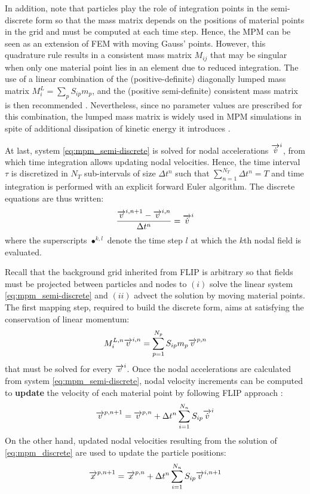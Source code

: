 In addition, note that particles play the role of integration points in the semi-discrete form so that the mass matrix depends on the positions of material points in the grid and must be computed at each time step. Hence, the MPM can be seen as an extension of FEM with moving Gauss' points. However, this quadrature rule results in a consistent mass matrix $M_{ij}$ that may be singular when only one material point lies in an element due to reduced integration. The use of a linear combination of the (positive-definite) diagonally lumped mass matrix $M^L_i=\sum_p S_{ip}m_p$, and the (positive semi-definite) consistent mass matrix is then recommended \cite{Love}. Nevertheless, since no parameter values are prescribed for this combination, the lumped mass matrix is widely used in MPM simulations in spite of additional dissipation of kinetic energy it introduces \cite{Mass_Flip}. 

At last, system \eqref{eq:mpm_semi-discrete} is solved for nodal accelerations ${\overrightarrow{\dot{v}}}^i$, from which time integration allows updating nodal velocities. Hence, the time interval $\tau$ is discretized in $N_T$ sub-intervals of size $\Delta t^n$ such that $\sum_{n=1}^{N_T} \Delta t^n = T$ and time integration is performed with an explicit forward Euler algorithm. The discrete equations are thus written:
\begin{equation}
  \label{eq:mpm_discrete}
  \frac{{\overrightarrow{v}}^{i,n+1}-{\overrightarrow{v}}^{i,n}}{\Delta t^n} = {\overrightarrow{\dot{v}}}^i
\end{equation}
where the superscripts $\bullet^{k,l}$ denote the time step $l$ at which the $k$th nodal field is evaluated. 

Recall that the background grid inherited from FLIP is arbitrary so that fields must be projected between particles and nodes to $(i)$ solve the linear system \eqref{eq:mpm_semi-discrete} and $(ii)$ advect the solution by moving material points. The first mapping step, required to build the discrete form, aims at satisfying the conservation of linear momentum:
\begin{equation}
  \label{eq:particles2nodes}
  M^{L,n}_i {\overrightarrow{v}}^{i,n} = \sum_{p=1}^{N_p} S_{ip}m_p {\overrightarrow{v}}^{p,n}
\end{equation}
that must be solved for every ${\overrightarrow{v}}^i$. Once the nodal accelerations are calculated from system \eqref{eq:mpm_semi-discrete}, nodal velocity increments can be computed to \textbf{update} the velocity of each material point by following FLIP approach \cite{PIC_Nishiguchi}:
\begin{equation}
  \label{eq:mp_velocity_update}
  {\overrightarrow{v}}^{p,n+1}= {\overrightarrow{v}}^{p,n}+ \Delta t^n \sum_{i=1}^{N_n} S_{ip}{\overrightarrow{\dot{v}}}^{i}
\end{equation}
On the other hand, updated nodal velocities resulting from the solution of \eqref{eq:mpm_discrete} are used to update the particle positions:
\begin{equation}
  \label{eq:position_update}
  {\overrightarrow{x}}^{p,n+1}={\overrightarrow{x}}^{p,n} + \Delta t^n\sum_{i=1}^{N_n} S_{ip}{\overrightarrow{v}}^{i,n+1} 
\end{equation}

